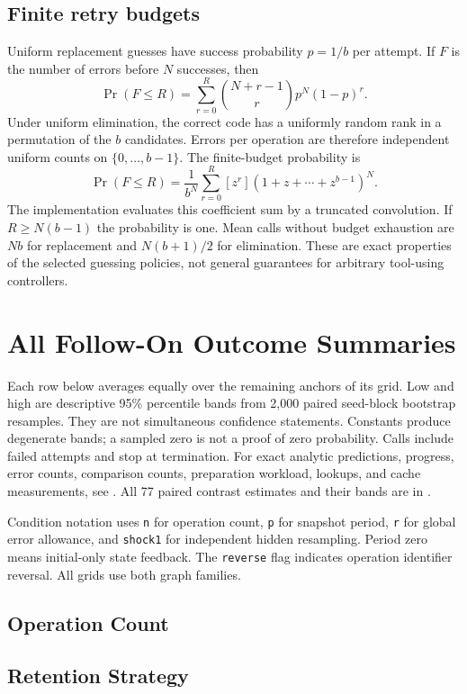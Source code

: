 \subsection{Finite retry budgets}
Uniform replacement guesses have success probability $p=1/b$ per attempt.
If $F$ is the number of errors before $N$ successes, then
\[
 \Pr(F\le R)=\sum_{r=0}^{R}
   {N+r-1\choose r}p^N(1-p)^r.
\]
Under uniform elimination, the correct code has a uniformly random rank
in a permutation of the $b$ candidates. Errors per operation are therefore
independent uniform counts on $\{0,\ldots,b-1\}$. The finite-budget
probability is
\[
 \Pr(F\le R)=\frac{1}{b^N}
 \sum_{r=0}^{R}[z^r](1+z+\cdots+z^{b-1})^N.
\]
The implementation evaluates this coefficient sum by a truncated
convolution. If $R\ge N(b-1)$ the probability is one. Mean calls without
budget exhaustion are $Nb$ for replacement and $N(b+1)/2$ for elimination.
These are exact properties of the selected guessing policies, not
general guarantees for arbitrary tool-using controllers.

\section{All Follow-On Outcome Summaries}
\label{app:ablationtables}
Each row below averages equally over the remaining anchors of its grid.
Low and high are descriptive 95\% percentile bands from 2,000 paired
seed-block bootstrap resamples. They are not simultaneous confidence
statements. Constants produce degenerate bands; a sampled zero is not
a proof of zero probability. Calls include failed attempts and stop at
termination. For exact analytic predictions, progress, error counts,
comparison counts, preparation workload, lookups, and cache measurements,
see . All 77 paired contrast estimates
and their bands are in .

Condition notation uses \texttt{n} for operation count, \texttt{p} for
snapshot period, \texttt{r} for global error allowance, and
\texttt{shock1} for independent hidden resampling. Period zero means
initial-only state feedback. The \texttt{reverse} flag indicates operation
identifier reversal. All grids use both graph families.

\small
\subsection{Operation Count}

\subsection{Retention Strategy}

